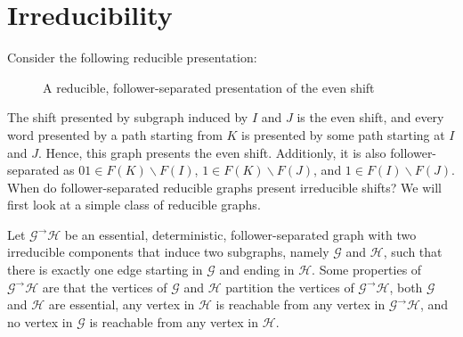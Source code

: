 \documentclass[hidelinks]{article}
\newcommand{\Lc}{\mathcal{L}}  %
\newcommand{\Gc}{\mathcal{G}}  %
\newcommand{\Hc}{\mathcal{H}}  %
\newcommand{\GtH}{{\Gc^\to\Hc}}
\theoremstyle{definition}
\begin{document}

\section{Irreducibility}

\noindent Consider the following reducible presentation:

\begin{figure}[h]
    \centering

    \caption{A reducible, follower-separated presentation of the even shift}
\end{figure}

\noindent The shift presented by subgraph induced by \(I\) and \(J\) is the even shift, and every 
word presented by a path starting from \(K\) is presented by some path starting at 
\(I\) and \(J\). Hence, this graph presents the even shift. Additionly, it is 
also follower-separated as \(01 \in F(K)\backslash F(I)\), \(1 \in F(K)\backslash F(J)\),
and \(1 \in F(I) \backslash F(J)\). 
When do follower-separated reducible graphs present irreducible shifts? We will first look 
at a simple class of reducible graphs.

Let \(\GtH\) be an essential, deterministic, follower-separated graph with two irreducible components
that induce two subgraphs, namely \(\Gc\) and \(\Hc\), such that there is 
exactly one edge starting in \(\Gc\) and ending in \(\Hc\). 
Some properties of \(\GtH\) are that the vertices of \(\Gc\) and \(\Hc\)
partition the vertices of \(\GtH\), both \(\Gc\) and \(\Hc\) are essential,  
any vertex in \(\Hc\) is reachable from any vertex in \(\GtH\), and no vertex in \(\Gc\) 
is reachable from any vertex in \(\Hc\).
\end{document}
